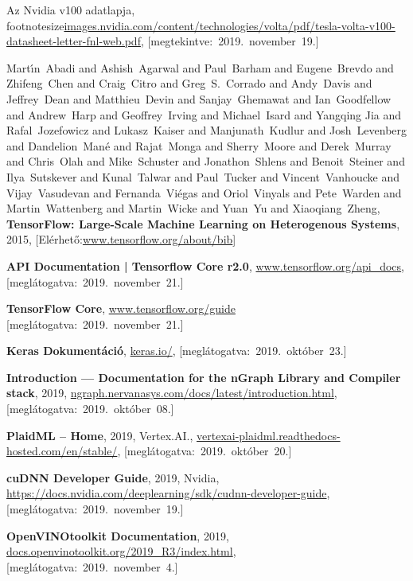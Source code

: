 \begin{thebibliography}{9}
	Az Nvidia v100 adatlapja,
	{footnotesize\url{images.nvidia.com/content/technologies/volta/pdf/tesla-volta-v100-datasheet-letter-fnl-web.pdf}},
	\mbox{[megtekintve:~2019.~november~19.]}

	Mart\'{\i}n~Abadi and
	Ashish~Agarwal and
	Paul~Barham and
	Eugene~Brevdo and
	Zhifeng~Chen and
	Craig~Citro and
	Greg~S.~Corrado and
	Andy~Davis and
	Jeffrey~Dean and
	Matthieu~Devin and
	Sanjay~Ghemawat and
	Ian~Goodfellow and
	Andrew~Harp and
	Geoffrey~Irving and
	Michael~Isard and
	Yangqing Jia and
	Rafal~Jozefowicz and
	Lukasz~Kaiser and
	Manjunath~Kudlur and
	Josh~Levenberg and
	Dandelion~Man\'{e} and
	Rajat~Monga and
	Sherry~Moore and
	Derek~Murray and
	Chris~Olah and
	Mike~Schuster and
	Jonathon~Shlens and
	Benoit~Steiner and
	Ilya~Sutskever and
	Kunal~Talwar and
	Paul~Tucker and
	Vincent~Vanhoucke and
	Vijay~Vasudevan and
	Fernanda~Vi\'{e}gas and
	Oriol~Vinyals and
	Pete~Warden and
	Martin~Wattenberg and
	Martin~Wicke and
	Yuan~Yu and
	Xiaoqiang~Zheng,
	\textbf{{TensorFlow}: Large-Scale Machine Learning on Heterogenous Systems},
	2015,
	[Elérhető:\footnotesize\url{www.tensorflow.org/about/bib}]

	\textbf{API Documentation | Tensorflow Core r2.0},
	{\footnotesize\url{www.tensorflow.org/api_docs}},
	\mbox{[meglátogatva:~2019.~november~21.]}

	\textbf{TensorFlow Core},
	{\footnotesize\url{www.tensorflow.org/guide}}
	\mbox{[meglátogatva:~2019.~november~21.]}

	\textbf{Keras Dokumentáció},
	{\footnotesize\url{keras.io/}},
	\mbox{[meglátogatva:~2019.~október~23.]}

	\textbf{Introduction --- Documentation for the {nGraph} Library and Compiler stack},
	2019,
	{\footnotesize\url{ngraph.nervanasys.com/docs/latest/introduction.html}},
	\mbox{[meglátogatva:~2019.~október~08.]}

	\textbf{PlaidML -- Home},
	2019,
	Vertex.AI.,
	{\footnotesize\url{vertexai-plaidml.readthedocs-hosted.com/en/stable/}},
	\mbox{[meglátogatva:~2019.~október~20.]}

	\textbf{cuDNN Developer Guide},
	2019,
	Nvidia,
	{\footnotesize\url{https://docs.nvidia.com/deeplearning/sdk/cudnn-developer-guide}},
	\mbox{[meglátogatva:~2019.~november~19.]}

	\textbf{OpenVINO\textsuperscript{\texttrademark}\space toolkit Documentation},
	2019,
	{\footnotesize\url{docs.openvinotoolkit.org/2019_R3/index.html}},
	\mbox{[meglátogatva:~2019.~november~4.]}


\end{thebibliography}
